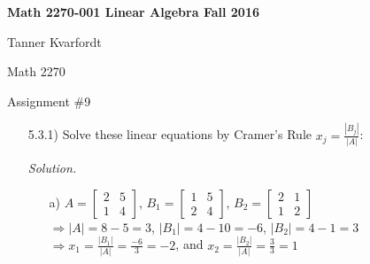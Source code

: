 \documentclass[12pt,pdftex]{article}
\begin{document}
\begin{center}
\textbf{Math 2270-001 \hspace{10pt} Linear Algebra \hspace{10pt}  Fall 2016}
\end{center}

\hfill Tanner Kvarfordt

\hfill Math 2270

\hfill Assignment \#9


\begin{itemize}
\item[5.3.1)] Solve these linear equations by Cramer's Rule $x_j=\frac{|B_j|}{|A|}$: \\ \vspace{4mm}

\textit{Solution.}
\begin{itemize}
\item[a)] $A=\begin{bmatrix}
		  2 & 5 \\ 1 & 4
		  \end{bmatrix}$, 
          $B_1=\begin{bmatrix}
          1 & 5 \\ 2 & 4
          \end{bmatrix}$, 
          $B_2=\begin{bmatrix}
          2 & 1 \\ 1 & 2
          \end{bmatrix}$ \\ $\Rightarrow
          |A|=8-5=3$, $|B_1|=4-10=-6$, $|B_2|=4-1=3$ \\ $\Rightarrow
          x_1=\frac{|B_1|}{|A|}=\frac{-6}{3}=-2$, and $x_2=\frac{|B_2|}{|A|}=\frac{3}{3}=1$
          

\end{itemize}
\end{itemize}
\end{document}
